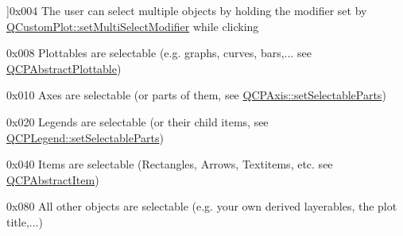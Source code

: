 \begin{Desc}
\begin{description}
{}]{\ttfamily 0x004} The user can select multiple objects by holding the modifier set by \hyperlink{class_q_custom_plot_a8fc96e3b5138a06759a2a90c166df516}{Q\+Custom\+Plot\+::set\+Multi\+Select\+Modifier} while clicking \item[{\em 
\hypertarget{namespace_q_c_p_a2ad6bb6281c7c2d593d4277b44c2b037a67148c8227b4155eca49135fc274c7ec}{}i\+Select\+Plottables\label{namespace_q_c_p_a2ad6bb6281c7c2d593d4277b44c2b037a67148c8227b4155eca49135fc274c7ec}
}]{\ttfamily 0x008} Plottables are selectable (e.\+g. graphs, curves, bars,... see \hyperlink{class_q_c_p_abstract_plottable}{Q\+C\+P\+Abstract\+Plottable}) \item[{\em 
\hypertarget{namespace_q_c_p_a2ad6bb6281c7c2d593d4277b44c2b037ad6644ac55bef621645326e9dd7469caa}{}i\+Select\+Axes\label{namespace_q_c_p_a2ad6bb6281c7c2d593d4277b44c2b037ad6644ac55bef621645326e9dd7469caa}
}]{\ttfamily 0x010} Axes are selectable (or parts of them, see \hyperlink{class_q_c_p_axis_a513f9b9e326c505d9bec54880031b085}{Q\+C\+P\+Axis\+::set\+Selectable\+Parts}) \item[{\em 
\hypertarget{namespace_q_c_p_a2ad6bb6281c7c2d593d4277b44c2b037a269c9af298e257d1108edec0432b5513}{}i\+Select\+Legend\label{namespace_q_c_p_a2ad6bb6281c7c2d593d4277b44c2b037a269c9af298e257d1108edec0432b5513}
}]{\ttfamily 0x020} Legends are selectable (or their child items, see \hyperlink{class_q_c_p_legend_a9ce60aa8bbd89f62ae4fa83ac6c60110}{Q\+C\+P\+Legend\+::set\+Selectable\+Parts}) \item[{\em 
\hypertarget{namespace_q_c_p_a2ad6bb6281c7c2d593d4277b44c2b037aea2f7c105d674e76d9b187b02ef29260}{}i\+Select\+Items\label{namespace_q_c_p_a2ad6bb6281c7c2d593d4277b44c2b037aea2f7c105d674e76d9b187b02ef29260}
}]{\ttfamily 0x040} Items are selectable (Rectangles, Arrows, Textitems, etc. see \hyperlink{class_q_c_p_abstract_item}{Q\+C\+P\+Abstract\+Item}) \item[{\em 
\hypertarget{namespace_q_c_p_a2ad6bb6281c7c2d593d4277b44c2b037af67a50bc26147a13b551b3a625374949}{}i\+Select\+Other\label{namespace_q_c_p_a2ad6bb6281c7c2d593d4277b44c2b037af67a50bc26147a13b551b3a625374949}
}]{\ttfamily 0x080} All other objects are selectable (e.\+g. your own derived layerables, the plot title,...) \end{description}
\end{Desc}


